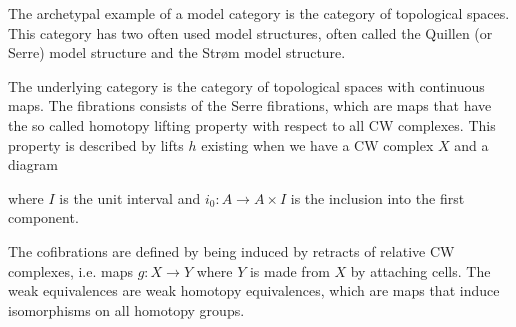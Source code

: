 The archetypal example of a model category is the category of topological spaces. This category has two often used model structures, often called the Quillen (or Serre) model structure and the Strøm model structure. 

\begin{example}
The underlying category is the category of topological spaces with continuous maps. The fibrations consists of the Serre fibrations, which are maps that have the so called homotopy lifting property with respect to all CW complexes. This property is described by lifts $h$ existing when we have a CW complex $X$ and a diagram
\begin{center}
\end{center}
where $I$ is the unit interval and $i_0:A\longrightarrow A\times I$ is the inclusion into the first component. 

The cofibrations are defined by being induced by retracts of relative CW complexes, i.e. maps $g:X\longrightarrow Y$ where $Y$ is made from $X$ by attaching cells. The weak equivalences are weak homotopy equivalences, which are maps that induce isomorphisms on all homotopy groups. 
\end{example}

